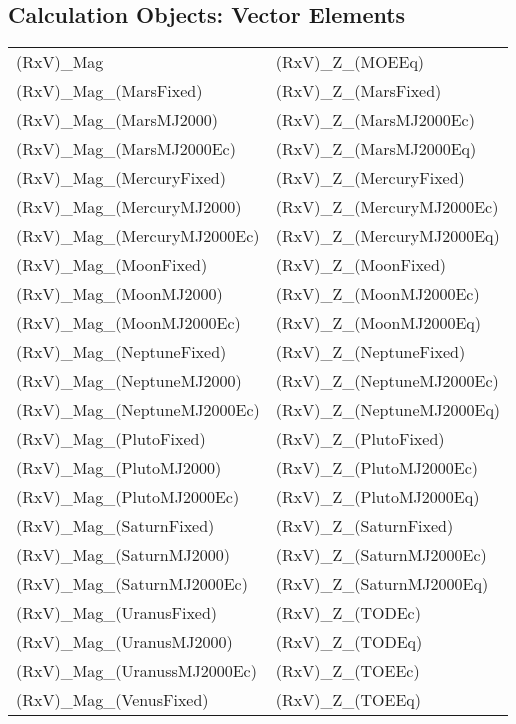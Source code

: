 \subsection{Calculation Objects: Vector Elements}
\begin{table}[htbp!]
\centering
    \begin{tabular}{ll}
    (RxV)\_Mag & (RxV)\_Z\_(MOEEq)\\
    (RxV)\_Mag\_(MarsFixed) & (RxV)\_Z\_(MarsFixed)\\
    (RxV)\_Mag\_(MarsMJ2000) & (RxV)\_Z\_(MarsMJ2000Ec)\\
    (RxV)\_Mag\_(MarsMJ2000Ec) & (RxV)\_Z\_(MarsMJ2000Eq)\\
    (RxV)\_Mag\_(MercuryFixed) & (RxV)\_Z\_(MercuryFixed)\\
    (RxV)\_Mag\_(MercuryMJ2000) & (RxV)\_Z\_(MercuryMJ2000Ec)\\
    (RxV)\_Mag\_(MercuryMJ2000Ec) & (RxV)\_Z\_(MercuryMJ2000Eq)\\
    (RxV)\_Mag\_(MoonFixed) & (RxV)\_Z\_(MoonFixed)\\
    (RxV)\_Mag\_(MoonMJ2000) & (RxV)\_Z\_(MoonMJ2000Ec)\\
    (RxV)\_Mag\_(MoonMJ2000Ec) & (RxV)\_Z\_(MoonMJ2000Eq)\\
    (RxV)\_Mag\_(NeptuneFixed) & (RxV)\_Z\_(NeptuneFixed)\\
    (RxV)\_Mag\_(NeptuneMJ2000) & (RxV)\_Z\_(NeptuneMJ2000Ec)\\
    (RxV)\_Mag\_(NeptuneMJ2000Ec) & (RxV)\_Z\_(NeptuneMJ2000Eq)\\
    (RxV)\_Mag\_(PlutoFixed) & (RxV)\_Z\_(PlutoFixed)\\
    (RxV)\_Mag\_(PlutoMJ2000) & (RxV)\_Z\_(PlutoMJ2000Ec)\\
    (RxV)\_Mag\_(PlutoMJ2000Ec) & (RxV)\_Z\_(PlutoMJ2000Eq)\\
    (RxV)\_Mag\_(SaturnFixed) & (RxV)\_Z\_(SaturnFixed)\\
    (RxV)\_Mag\_(SaturnMJ2000) & (RxV)\_Z\_(SaturnMJ2000Ec)\\
    (RxV)\_Mag\_(SaturnMJ2000Ec) & (RxV)\_Z\_(SaturnMJ2000Eq)\\
    (RxV)\_Mag\_(UranusFixed) & (RxV)\_Z\_(TODEc)\\
    (RxV)\_Mag\_(UranusMJ2000) & (RxV)\_Z\_(TODEq)\\
    (RxV)\_Mag\_(UranussMJ2000Ec) & (RxV)\_Z\_(TOEEc)\\
    (RxV)\_Mag\_(VenusFixed) & (RxV)\_Z\_(TOEEq)\\

\end{tabular}
\end{table}
